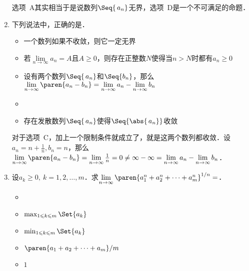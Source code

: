 \begin{enumerate}
  \ifshowsol
    选项~A其实相当于是说数列\(\Seq{\,a_n}\)无界，选项~D是一个不可满足的命题．
  \fi

\item 下列说法中，正确的是\uline{\makebox[10em]{}}．
  \begin{itemize}
    \renewcommand{\labelitemi}{\faCircleThin}
  \item 一个数列如果不收敛，则它一定无界
  \item 若\(\lim\limits_{n\to\infty} a_n = A\)且\(A \ge 0\)，则存在正整数\(N\)使得当\(n > N\)时都有\(a_n \ge 0\)
  \item 设有两个数列\(\Seq{\,a_n}\)和\(\Seq{b_n}\)，那么\(\lim\limits_{n\to\infty} \paren{a_n - b_n} = \lim\limits_{n\to\infty} a_n - \lim\limits_{n\to\infty} b_n\)
    \ifshowsol
    \item[\faCircle]
    \else
    \item
    \fi
    存在发散数列\(\Seq{\,a_n}\)使得\(\Seq{\abs{\,a_n}}\)收敛
  \end{itemize}

  \ifshowsol
    对于选项~C，加上一个限制条件就成立了，就是这两个数列都收敛．设\(a_n = n + \frac1n, b_n = n\)，那么\(\lim\limits_{n\to\infty} \paren{a_n - b_n} = \lim\limits_{n\to\infty} \frac1n = 0 \ne \infty - \infty = \lim\limits_{n\to\infty} a_n - \lim\limits_{n\to\infty} b_n\)．
  \fi

\item 设\(a_k \ge 0,\ k = 1, 2, \dots, m\)．求\(\lim\limits_{n\to\infty} \paren{a_1^n + a_2^n + \dots + a_m^n}^{1/n} =\)\uline{\makebox[6em]{}}．
  \begin{itemize}
    \renewcommand{\labelitemi}{\faCircleThin}
    \ifshowsol
    \item[\faCircle]
    \else
    \item
    \fi
    \(\max_{1 \le k \le m} \Set{a_k}\)
  \item \(\min_{1 \le k \le m} \Set{a_k}\)
  \item \(\paren{a_1 + a_2 + \dots + a_m}/{m}\) %
  \item \(1\)
  \end{itemize}


\end{enumerate}
